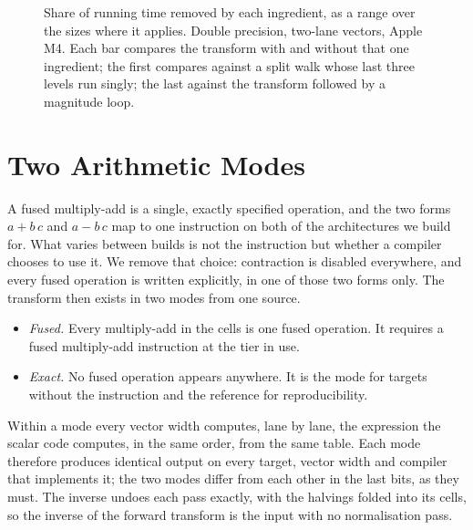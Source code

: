 \documentclass[conference]{IEEEtran}
\begin{document}
\begin{figure}[t]
\centering
{}
\caption{Share of running time removed by each ingredient, as a range over the sizes where it applies. Double precision, two-lane vectors, Apple M4. Each bar compares the transform with and without that one ingredient; the first compares against a split walk whose last three levels run singly; the last against the transform followed by a magnitude loop.}
\label{fig:gains}
\end{figure}

\section{Two Arithmetic Modes}\label{sec:modes}

A fused multiply-add is a single, exactly specified operation, and the two forms $a+b\,c$ and $a-b\,c$ map to one instruction on both of the architectures we build for.
What varies between builds is not the instruction but whether a compiler chooses to use it.
We remove that choice: contraction is disabled everywhere, and every fused operation is written explicitly, in one of those two forms only.
The transform then exists in two modes from one source.
\begin{itemize}
\item \emph{Fused.} Every multiply-add in the cells is one fused operation. It requires a fused multiply-add instruction at the tier in use.
\item \emph{Exact.} No fused operation appears anywhere. It is the mode for targets without the instruction and the reference for reproducibility.
\end{itemize}
Within a mode every vector width computes, lane by lane, the expression the scalar code computes, in the same order, from the same table.
Each mode therefore produces identical output on every target, vector width and compiler that implements it; the two modes differ from each other in the last bits, as they must.
The inverse undoes each pass exactly, with the halvings folded into its cells, so the inverse of the forward transform is the input with no normalisation pass.
\end{document}
